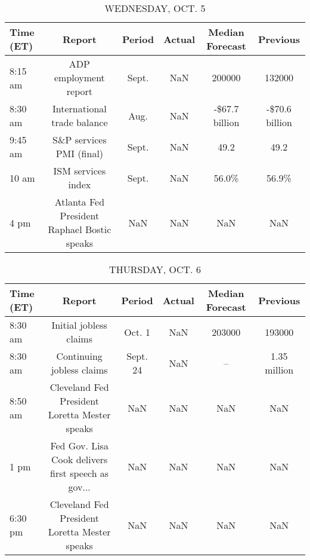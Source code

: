 \documentclass{article}%
\begin{document}
%


\begin{table}[htbp]%
\caption{WEDNESDAY, OCT. 5}%
\centering%
\begin{adjustbox}{width=1\textwidth}%
\begin{tabular}{lccccc}
\toprule
Time (ET) &                                      Report & Period & Actual & Median Forecast &       Previous \\
\midrule
  8:15 am &                       ADP employment report &  Sept. &    NaN &          200000 &         132000 \\
  8:30 am &                 International trade balance &   Aug. &    NaN &  -\$67.7 billion & -\$70.6 billion \\
  9:45 am &                    S\&P services PMI (final) &  Sept. &    NaN &            49.2 &           49.2 \\
    10 am &                          ISM services index &  Sept. &    NaN &           56.0\% &          56.9\% \\
     4 pm & Atlanta Fed President Raphael Bostic speaks &    NaN &    NaN &             NaN &            NaN \\
\bottomrule
\end{tabular}
%
\end{adjustbox}%
\end{table}

%


\begin{table}[htbp]%
\caption{THURSDAY, OCT. 6}%
\centering%
\begin{adjustbox}{width=1\textwidth}%
\begin{tabular}{lccccc}
\toprule
Time (ET) &                                             Report &   Period & Actual & Median Forecast &     Previous \\
\midrule
  8:30 am &                             Initial jobless claims &   Oct. 1 &    NaN &          203000 &       193000 \\
  8:30 am &                          Continuing jobless claims & Sept. 24 &    NaN &              -- & 1.35 million \\
  8:50 am &      Cleveland Fed President Loretta Mester speaks &      NaN &    NaN &             NaN &          NaN \\
     1 pm & Fed Gov. Lisa Cook delivers first speech as gov... &      NaN &    NaN &             NaN &          NaN \\
  6:30 pm &      Cleveland Fed President Loretta Mester speaks &      NaN &    NaN &             NaN &          NaN \\
\bottomrule
\end{tabular}
%
\end{adjustbox}%
\end{table}
\end{document}
